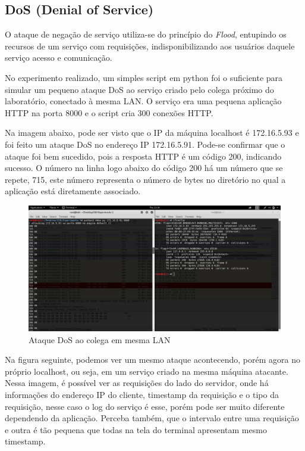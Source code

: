 \documentclass[journal]{IEEEtran}
\begin{document}
\subsection{DoS (Denial of Service)}
O ataque de negação de serviço utiliza-se do princípio do \textit{Flood}, entupindo os recursos de um serviço com requisições, indisponibilizando aos usuários daquele serviço acesso e comunicação. \par
No experimento realizado, um simples script em python foi o suficiente para simular um pequeno ataque DoS ao serviço criado pelo colega próximo do laboratório, conectado à mesma LAN. O serviço era uma pequena aplicação HTTP na porta 8000 e o script cria 300 conexões HTTP.\par
Na imagem abaixo, pode ser visto que o IP da máquina localhost é 172.16.5.93 e foi feito um ataque DoS no endereço IP 172.16.5.91. Pode-se confirmar que o ataque foi bem sucedido, pois a resposta HTTP é um código 200, indicando sucesso. O número na linha logo abaixo do código 200 há um número que se repete, 715, este número representa o número de bytes no diretório no qual a aplicação está diretamente associado. 

\begin{figure}[h!]
	\includegraphics[width=\linewidth]{../fotos_experimento_2/atacandoRodrigo.png}
	\caption{Ataque DoS ao colega em mesma LAN}
	\label{fig:Ataque_a_terceiro}
\end{figure}

Na figura seguinte, podemos ver um mesmo ataque acontecendo, porém agora no próprio localhost, ou seja, em um serviço criado na mesma máquina atacante. Nessa imagem, é possível ver as requisições do lado do servidor, onde há informações do endereço IP do cliente, timestamp da requisição e o tipo da requisição, nesse caso o log do serviço é esse, porém pode ser muito diferente dependendo da aplicação. Perceba também, que o intervalo entre uma requisição e outra é tão pequena que todas na tela do terminal apresentam mesmo timestamp.
\end{document}
